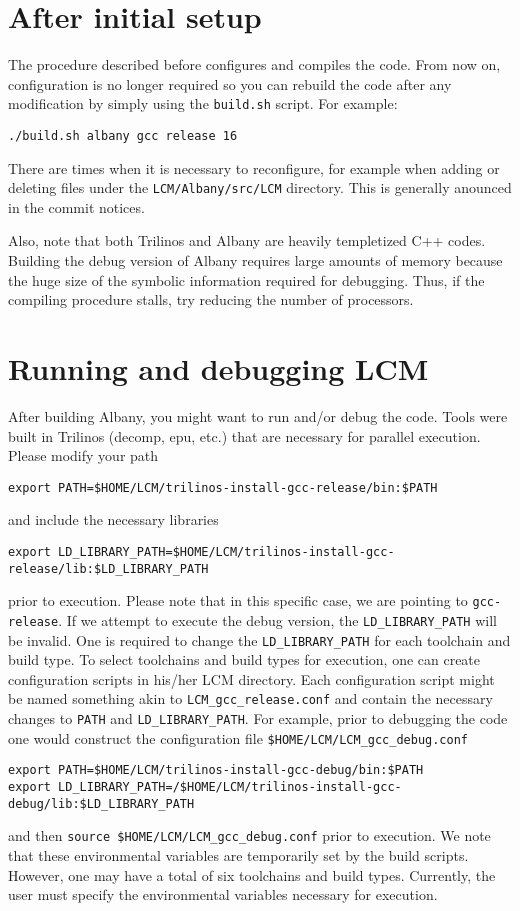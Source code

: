 \documentclass[10pt,a4paper]{article} \usepackage[utf8]{inputenc}
\begin{document}
\section{After initial setup}
The procedure described before configures and compiles the code. From
now on, configuration is no longer required so you can rebuild the
code after any modification by simply using the \verb+build.sh+
script. For example:
\begin{verbatim}
./build.sh albany gcc release 16
\end{verbatim}

There are times when it is necessary to reconfigure, for example when
adding or deleting files under the \verb+LCM/Albany/src/LCM+
directory. This is generally anounced in the commit notices.

Also, note that both Trilinos and Albany are heavily templetized C++
codes. Building the debug version of Albany requires large amounts of
memory because the huge size of the symbolic information required for
debugging. Thus, if the compiling procedure stalls, try reducing the
number of processors.

\section{Running and debugging LCM} 

After building Albany, you might want to run and/or debug the code. 
Tools were built in Trilinos (decomp, epu, etc.) that are necessary for parallel execution. 
Please modify your path
\begin{verbatim}
export PATH=$HOME/LCM/trilinos-install-gcc-release/bin:$PATH
\end{verbatim}
and include the necessary libraries
\begin{verbatim}
export LD_LIBRARY_PATH=$HOME/LCM/trilinos-install-gcc-release/lib:$LD_LIBRARY_PATH
\end{verbatim}
prior to execution. Please note that in this specific case, we are pointing to 
\verb+gcc-release+.
If we attempt to execute the debug version, the \verb+LD_LIBRARY_PATH+ will be invalid.
One is required to change the  \verb+LD_LIBRARY_PATH+ for each toolchain and build type.
To select toolchains and build types for execution, one can create configuration scripts in his/her LCM
directory. Each configuration script might be named something akin to \verb+LCM_gcc_release.conf+ 
and contain the necessary changes to \verb+PATH+ and \verb+LD_LIBRARY_PATH+. For example,
prior to debugging the code one would construct the configuration file  
\verb+$HOME/LCM/LCM_gcc_debug.conf+
\begin{verbatim}
export PATH=$HOME/LCM/trilinos-install-gcc-debug/bin:$PATH
export LD_LIBRARY_PATH=/$HOME/LCM/trilinos-install-gcc-debug/lib:$LD_LIBRARY_PATH
\end{verbatim}
and then \verb+source $HOME/LCM/LCM_gcc_debug.conf+ prior to execution. We note that these 
environmental variables are temporarily set by the build scripts. However, one may have a total of six
toolchains and build types. Currently, the user must specify the environmental variables 
necessary for execution. 
\end{document}
